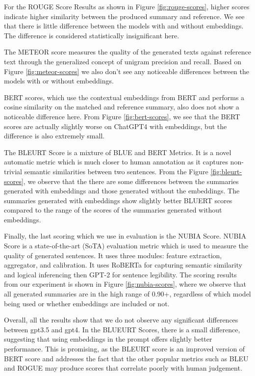 \documentclass[conference]{IEEEtran}
\begin{document}
For the ROUGE Score Results as shown in Figure \ref{fig:rouge-scores}, higher scores indicate higher similarity between the produced summary and reference. We see that there is little difference between the models with and without embeddings. The difference is considered statistically insignificant here.

The METEOR score measures the quality of the generated texts against reference text through the generalized concept of unigram precision and recall. Based on Figure \ref{fig:meteor-scores} we also don't see any noticeable differences between the models with or without embeddings. 

BERT scores, which use the contextual embeddings from BERT and performs a cosine similarity on the matched and reference summary, also does not show a noticeable difference here. From Figure \ref{fig:bert-scores}, we see that the BERT scores are actually slightly worse on ChatGPT4 with embeddings, but the difference is also extremely small. 

The BLEURT Score is a mixture of BLUE and BERT Metrics. It is a novel automatic metric which is much closer to human annotation as it captures non-trivial semantic similarities between two sentences. From the Figure \ref{fig:bleurt-scores}, we observe that the there are some differences between the summaries generated with embeddings and those generated without the embeddings. The summaries generated with embeddings show slightly better BLUERT scores compared to the range of the scores of the summaries generated without embeddings. 

Finally, the last scoring which we use in evaluation is the NUBIA Score. NUBIA Score is a state-of-the-art (SoTA) evaluation metric which is used to measure the quality of generated sentences. It uses three modules: feature extraction, aggregator, and calibration. It uses RoBERTa for capturing semantic similarity and logical inferencing then GPT-2 for sentence legibility. The scoring results from our experiment is shown in Figure \ref{fig:nubia-scores}, where we observe that all generated summaries are in the high range of 0.90+, regardless of which model being used or whether embeddings are included or not.

Overall, all the results show that we do not observe any significant differences between gpt3.5 and gpt4. In the BLUEURT Scores, there is a small difference, suggesting that using embeddings in the prompt offers slightly better performance. This is promising, as the BLEURT score is an improved version of BERT score and addresses the fact that the other popular metrics such as BLEU and ROGUE may produce scores that correlate poorly with human judgement.
\end{document}
